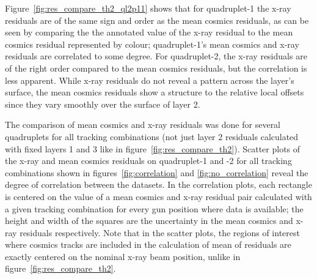 Figure~\ref{fig:res_compare_th2_ql2p11} shows that for quadruplet-1 the x-ray residuals are of the same sign and order as the mean cosmics residuals, as can be seen by comparing the the annotated value of the x-ray residual to the mean cosmics residual represented by colour; quadruplet-1's mean cosmics and x-ray residuals are correlated to some degree. For quadruplet-2, the x-ray residuals are of the right order compared to the mean cosmics residuals, but the correlation is less apparent. While x-ray residuals do not reveal a pattern across the layer's surface, the mean cosmics residuals show a structure to the relative local offsets since they vary smoothly over the surface of layer 2. 

The comparison of mean cosmics and x-ray residuals was done for several quadruplets for all tracking combinations (not just layer 2 residuals calculated with fixed layers 1 and 3 like in figure~\ref{fig:res_compare_th2}). Scatter plots of the x-ray and mean cosmics residuals on quadruplet-1 and -2 for all tracking combinations shown in figures~\ref{fig:correlation} and \ref{fig:no_correlation} reveal the degree of correlation between the datasets. In the correlation plots, each rectangle is centered on the value of a mean cosmics and x-ray residual pair calculated with a given tracking combination for every gun position where data is available; the height and width of the squares are the uncertainty in the mean cosmics and x-ray residuals respectively. Note that in the scatter plots, the regions of interest where cosmics tracks are included in the calculation of mean of residuals are exactly centered on the nominal x-ray beam position, unlike in figure~\ref{fig:res_compare_th2}.


